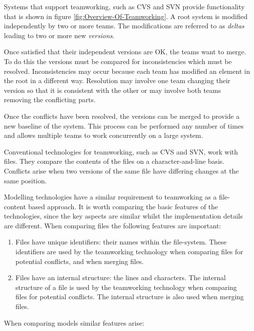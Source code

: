 Systems that support teamworking, such as CVS and SVN provide functionality
that is shown in figure \ref{fig:Overview-Of-Teamworking}. A root
system is modified independently by two or more teams. The modifications
are referred to as \textit{deltas} leading to two or more new \textit{versions}. 

Once satisfied that their independent versions are OK, the teams want
to merge. To do this the versions must be compared for inconsistencies
which must be resolved. Inconsistencies may occur because each team
has modified an element in the root in a different way. Resolution
may involve one team changing their version so that it is consistent
with the other or may involve both teams removing the conflicting
parts.

Once the conflicts have been resolved, the versions can be merged
to provide a new baseline of the system. This process can be performed
any number of times and allows multiple teams to work concurrently
on a large system.

Conventional technologies for teamworking, such as CVS and SVN, work
with files. They compare the contents of the files on a character-and-line
basis. Conflicts arise when two versions of the same file have differing
changes at the same position.

Modelling technologies have a similar requirement to teamworking as
a file-content based approach. It is worth comparing the basic features
of the technologies, since the key aspects are similar whilst the
implementation details are different. When comparing files the following
features are important:

\begin{enumerate}
\item Files have unique identifiers: their names within the file-system.
These identifiers are used by the teamworking technology when comparing
files for potential conflicts, and when merging files.
\item Files have an internal structure: the lines and characters. The internal
structure of a file is used by the teamworking technology when comparing
files for potential conflicts. The internal structure is also used
when merging files.
\end{enumerate}
When comparing models similar features arise:

